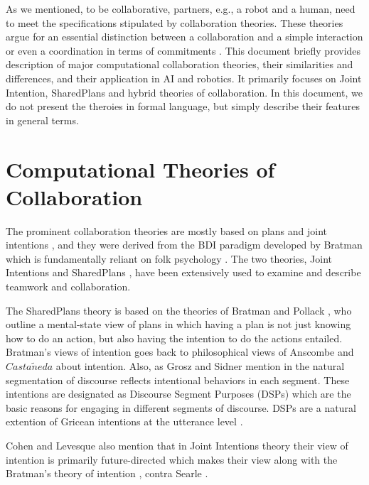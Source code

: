 \documentclass[11pt]{article}
\begin{document}
As we mentioned, to be collaborative, partners, e.g., a robot and a human, need
to meet the specifications stipulated by collaboration theories. These theories
argue for an essential distinction between a collaboration and a simple
interaction or even a coordination in terms of commitments
\cite{grosz:shared-plans, lochbaum:collaborative-planning}. This document
briefly provides description of major computational collaboration theories,
their similarities and differences, and their application in AI and robotics. It
primarily focuses on Joint Intention, SharedPlans and hybrid theories of
collaboration. In this document, we do not present the theroies in formal
language, but simply describe their features in general terms.

\section{Computational Theories of Collaboration}

The prominent collaboration theories are mostly based on plans and joint
intentions \cite{cohen:teamwork} \cite{grosz:plans-discourse}
\cite{Litman:discourse-commonsense}, and they were derived from the BDI
paradigm developed by Bratman \cite{bratman:intentions-plans} which is
fundamentally reliant on folk psychology \cite{ravenscroft:folk}. The two
theories, Joint Intentions \cite{cohen:teamwork} and SharedPlans
\cite{grosz:plans-discourse}, have been extensively used to examine and describe
teamwork and collaboration.

The SharedPlans theory is based on the theories of Bratman and Pollack
\cite{bratman:plans-reasoning,pollack:plan-inference,
pollack:plan-mental-attitudes}, who outline a mental-state view of plans in
which having a plan is not just knowing how to do an action, but also having the
intention to do the actions entailed. Bratman's views of intention goes back to
philosophical views of Anscombe \cite{anscombe:intention} and
$Casta\tilde{n}eda$ \cite{castaneda:thinking} about intention. Also, as Grosz
and Sidner mention in \cite{grosz:plans-discourse} the natural segmentation of
discourse reflects intentional behaviors in each segment. These intentions are
designated as Discourse Segment Purposes (DSPs) which are the basic reasons for
engaging in different segments of discourse. DSPs are a natural extention of
Gricean intentions at the utterance level \cite{neale:grice-language}.

Cohen and Levesque also mention that in Joint Intentions theory their view of
intention is primarily future-directed \cite{cohen:intention-commitment} which
makes their view along with the Bratman's theory of intention
\cite{bratman:intention}, contra Searle \cite{searle:collective}.
\end{document}
